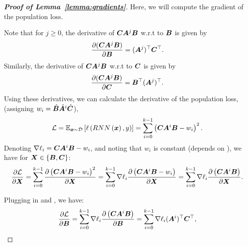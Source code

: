 \begin{proof}[\textbf{Proof of Lemma~\ref{lemma:gradients}}]
Here, we will compute the gradient of the population loss.

Note that for $j\ge 0$, the derivative of ${\bm{C}}{\bm{A}}^j{\bm{B}}$ w.r.t to ${\bm{B}}$ is given by
\begin{equation}\label{eq:apdx:dB}
    \frac{\partial ({\bm{C}}{\bm{A}}^j{\bm{B}})}{\partial {\bm{B}}}=({\bm{A}}^j)^\top{\bm{C}}^\top.
\end{equation}
%
Similarly, the derivative of ${\bm{C}}{\bm{A}}^j{\bm{B}}$ w.r.t to ${\bm{C}}$ is given by
\begin{equation}\label{eq:apdx:dC}
    \frac{\partial ({\bm{C}}{\bm{A}}^j{\bm{B}})}{\partial {\bm{C}}}={\bm{B}}^\top({\bm{A}}^j)^\top.
\end{equation}
%
%
Using these derivatives, we can calculate the derivative of the population loss, (assigning $w_i=\hat{{\bm{B}}}\hat{{\bm{A}}}^i\hat{{\bm{C}}}$),
\begin{equation}
    \mathcal{L} = \mathbb{E}_{{\bm{x}}\sim\mathcal{D}}\left[ \ell\left( RNN\left({\bm{x}}\right), y\right)\right]=  \sum_{i=0}^{k-1} \left( {\bm{C}}{\bm{A}}^i{\bm{B}} - w_i \right)^2.
\end{equation}
%
Denoting $\nabla \ell_i = {\bm{C}}{\bm{A}}^i{\bm{B}}-w_i$, and noting that $w_i$ is constant (depends on \smash{$\hat{\Theta}$}), we have for ${\bm{X}} \in \{{\bm{B}}, {\bm{C}}\}$:
\begin{equation}
    \frac{\partial \mathcal{L}}{\partial {\bm{X}}} =  \sum_{i=0}^{k-1} \frac{\partial\left( {\bm{C}}{\bm{A}}^i{\bm{B}} - w_i \right)^2}{\partial {\bm{X}}} = \sum_{i=0}^{k-1} \nabla \ell_i \frac{\partial\left( {\bm{C}}{\bm{A}}^i{\bm{B}} - w_i \right)}{\partial {\bm{X}}} = \sum_{i=0}^{k-1} \nabla \ell_i \frac{\partial\left( {\bm{C}}{\bm{A}}^i{\bm{B}} \right)}{\partial {\bm{X}}}.
\end{equation}

Plugging in  and , we have:
\begin{equation}
    \frac{\partial \mathcal{L}}{\partial {\bm{B}}} = \sum_{i=0}^{k-1} \nabla \ell_i \frac{\partial\left( {\bm{C}}{\bm{A}}^i{\bm{B}} \right)}{\partial {\bm{B}}} = \sum_{i=0}^{k-1} \nabla \ell_i ({\bm{A}}^i)^\top {\bm{C}}^\top,
\end{equation}


\end{proof}
